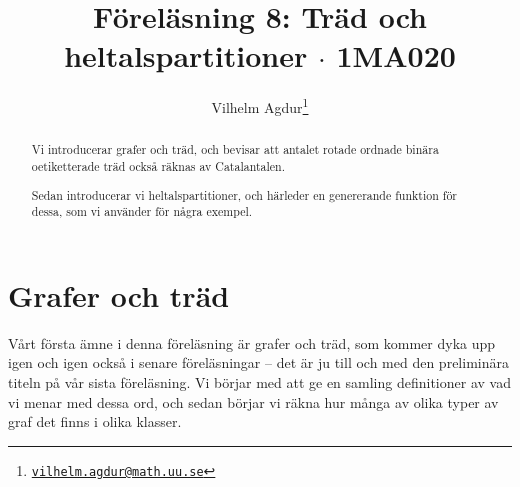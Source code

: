 \documentclass[nobib]{tufte-handout}
\title{Föreläsning 8: Träd och heltalspartitioner $\cdot$ 1MA020}
\author[Vilhelm Agdur]{Vilhelm Agdur\thanks{\href{mailto:vilhelm.agdur@math.uu.se}{\nolinkurl{vilhelm.agdur@math.uu.se}}}}
\begin{document}

\maketitle%

\begin{abstract}
\noindent
Vi introducerar grafer och träd, och bevisar att antalet rotade ordnade binära oetiketterade träd också räknas av Catalantalen.

Sedan introducerar vi heltalspartitioner, och härleder en genererande funktion för dessa, som vi använder för några exempel.
\end{abstract}

\section{Grafer och träd}

Vårt första ämne i denna föreläsning är grafer och träd, som kommer dyka upp igen och igen också i senare föreläsningar -- det är ju till och med den preliminära titeln på vår sista föreläsning. Vi börjar med att ge en samling definitioner av vad vi menar med dessa ord, och sedan börjar vi räkna hur många av olika typer av graf det finns i olika klasser.
\end{document}

